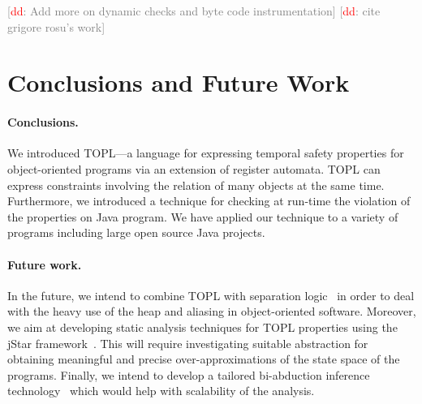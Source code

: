 \documentclass{sigplanconf}[10pt] %
\newcommand{\noterg}[2]{\textcolor{gray}{[\textcolor{red}{#1}: #2]}}
\newcommand{\dd}[1]{\noterg{dd}{#1}}
\newcommand{\dinocomment}[1]{\dd{#1}}
\begin{document}
\dinocomment{Add more on dynamic checks and byte code instrumentation}
\dd{cite grigore rosu's work}
\section{Conclusions and Future Work}\label{sec:conclusions} %

\paragraph{Conclusions.}
We introduced TOPL---a language for expressing temporal safety properties for object-oriented programs via an extension of register automata.
TOPL can express constraints involving the relation of many objects at the same time.
Furthermore, we introduced a technique for checking at run-time the violation of the properties on Java program.
We have applied our technique to a variety of programs including large open source Java projects.
%
\paragraph{Future work.}
In the future, we intend to combine TOPL with  separation logic~\cite{reynolds2002} in order to deal with the heavy use of the heap and aliasing in object-oriented software.
Moreover, we aim at developing static analysis techniques for TOPL properties using the jStar framework~\cite{DBLP:conf/oopsla/DistefanoP08}.
This will require investigating suitable abstraction for obtaining meaningful and precise over-approximations of the state space of the programs.
Finally, we intend to develop a tailored bi-abduction inference technology~\cite{dblp:conf/popl/CalcagnoDOY09} which would help with scalability of the analysis.



\end{document}
